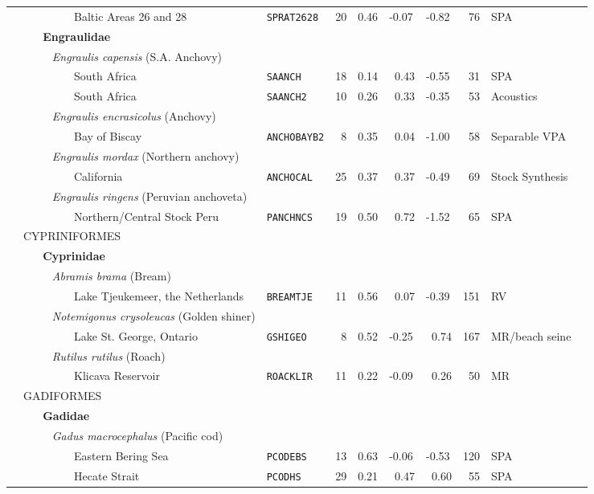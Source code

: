\begin{flushleft}
\begin{tabular*}{7.1in}{llllllllll}
&~~~~~~~~~Baltic Areas 26 and 28&{\tt SPRAT2628}&20&0.46&-0.07&-0.82&~76&SPA  & \\ 
&{\bf~~~Engraulidae}&~&~&~&~&~&~&~  & \\ 
&{\it~~~~~Engraulis capensis} (S.A. Anchovy)&~&~&~&~&~&~&~  & \\ 
&~~~~~~~~~South Africa&{\tt SAANCH}&18&0.14&~0.43&-0.55&~31&SPA  & \\ 
&~~~~~~~~~South Africa&{\tt SAANCH2}&10&0.26&~0.33&-0.35&~53&Acoustics  & \\ 
&{\it~~~~~Engraulis encrasicolus} (Anchovy)&~&~&~&~&~&~&~  & \\ 
&~~~~~~~~~Bay of Biscay&{\tt ANCHOBAYB2}&~8&0.35&~0.04&-1.00&~58&Separable VPA  & \\ 
&{\it~~~~~Engraulis mordax} (Northern anchovy)&~&~&~&~&~&~&~  & \\ 
&~~~~~~~~~California&{\tt ANCHOCAL}&25&0.37&~0.37&-0.49&~69&Stock Synthesis  & \\ 
&{\it~~~~~Engraulis ringens} (Peruvian anchoveta)&~&~&~&~&~&~&~  & \\ 
&~~~~~~~~~Northern/Central Stock Peru&{\tt PANCHNCS}&19&0.50&~0.72&-1.52&~65&SPA  & \\ 
&{\normalsize CYPRINIFORMES}&~&~&~&~&~&~&~  & \\ 
&{\bf~~~Cyprinidae}&~&~&~&~&~&~&~  & \\ 
&{\it~~~~~Abramis brama} (Bream)&~&~&~&~&~&~&~  & \\ 
&~~~~~~~~~Lake Tjeukemeer, the Netherlands&{\tt BREAMTJE}&11&0.56&~0.07&-0.39&151&RV  & \\ 
&{\it~~~~~Notemigonus crysoleucas} (Golden shiner)&~&~&~&~&~&~&~  & \\ 
&~~~~~~~~~Lake St. George, Ontario&{\tt GSHIGEO}&~8&0.52&-0.25&~0.74&167&MR/beach seine  & \\ 
&{\it~~~~~Rutilus rutilus} (Roach)&~&~&~&~&~&~&~  & \\ 
&~~~~~~~~~Klicava Reservoir&{\tt ROACKLIR}&11&0.22&-0.09&~0.26&~50&MR  & \\ 
&{\normalsize GADIFORMES}&~&~&~&~&~&~&~  & \\ 
&{\bf~~~Gadidae}&~&~&~&~&~&~&~  & \\ 
&{\it~~~~~Gadus macrocephalus} (Pacific cod)&~&~&~&~&~&~&~  & \\ 
&~~~~~~~~~Eastern Bering Sea&{\tt PCODEBS}&13&0.63&-0.06&-0.53&120&SPA  & \\ 
&~~~~~~~~~Hecate Strait&{\tt PCODHS}&29&0.21&~0.47&~0.60&~55&SPA  & \\ 

\end{tabular*}
\end{flushleft}
